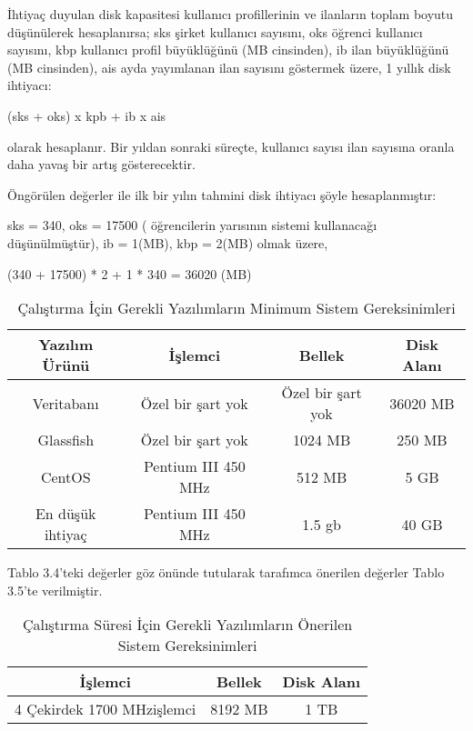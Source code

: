İhtiyaç duyulan disk kapasitesi kullanıcı profillerinin ve ilanların toplam boyutu düşünülerek 
hesaplanırsa; sks şirket kullanıcı sayısını, oks öğrenci kullanıcı sayısını, kbp kullanıcı profil büyüklüğünü (MB
cinsinden), ib ilan büyüklüğünü (MB cinsinden), ais ayda yayımlanan ilan sayısını göstermek üzere, 1 yıllık disk 
ihtiyacı:

(sks + oks) x kpb + ib x ais 

olarak hesaplanır. Bir yıldan sonraki süreçte, kullanıcı sayısı ilan sayısına oranla daha yavaş bir artış gösterecektir.

Öngörülen değerler ile ilk bir yılın tahmini disk ihtiyacı şöyle hesaplanmıştır:

sks = 340, oks = 17500 ( öğrencilerin yarısının sistemi kullanacağı düşünülmüştür), ib = 1(MB), kbp = 2(MB)  olmak üzere,

(340 + 17500) * 2 + 1 * 340 = 36020 (MB)

\begin{table}[]
\centering
\caption{Çalıştırma İçin Gerekli Yazılımların Minimum Sistem Gereksinimleri}
\label{my-label}
\begin{tabular}{|c|c|c|c|}
\hline
Yazılım Ürünü    & İşlemci             & Bellek            & Disk Alanı \\ \hline
Veritabanı       & Özel bir şart yok   & Özel bir şart yok & 36020 MB   \\ \hline
Glassfish        & Özel bir şart yok   & 1024 MB           & 250 MB     \\ \hline
CentOS           & Pentium III 450 MHz & 512 MB            & 5 GB       \\ \hline
En düşük ihtiyaç & Pentium III 450 MHz & 1.5 gb            & 40 GB      \\ \hline
\end{tabular}
\end{table}

Tablo 3.4’teki değerler göz önünde tutularak tarafımca önerilen değerler Tablo 3.5’te
verilmiştir.

\begin{table}[]
\centering
\caption{Çalıştırma Süresi İçin Gerekli Yazılımların Önerilen Sistem Gereksinimleri}
\label{my-label}
\begin{tabular}{|c|c|c|}
\hline
İşlemci                    & Bellek  & Disk Alanı \\ \hline
4 Çekirdek 1700 MHzişlemci & 8192 MB & 1 TB       \\ \hline
\end{tabular}
\end{table}

